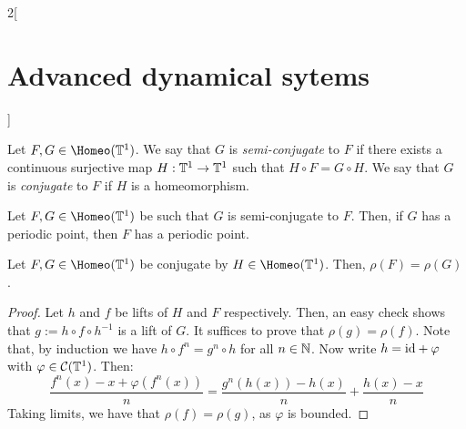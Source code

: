 \documentclass[../../../main_math.tex]{subfiles}
\begin{document}
\begin{multicols}{2}[\section{Advanced dynamical sytems}]
\begin{definition}
  \end{definition}
  \begin{definition}
    Let $F,G\in\Homeo(\TT^1)$. We say that $G$ is \emph{semi-conjugate} to $F$ if there exists a continuous surjective map $H:\mathbb{T}^1\to \mathbb{T}^1$ such that $H\circ F=G\circ H$. We say that $G$ is \emph{conjugate} to $F$ if $H$ is a homeomorphism.
  \end{definition}
  \begin{lemma}
    Let $F,G\in\Homeo(\TT^1)$ be such that $G$ is semi-conjugate to $F$. Then, if $G$ has a periodic point, then $F$ has a periodic point.
  \end{lemma}
  \begin{theorem}
    Let $F,G\in\Homeo(\TT^1)$ be conjugate by $H\in \Homeo(\TT^1)$. Then, $\rho(F)=\rho(G)$.
  \end{theorem}
  \begin{proof}
    Let $h$ and $f$ be lifts of $H$ and $F$ respectively. Then, an easy check shows that $g:=h\circ f\circ h^{-1}$ is a lift of $G$. It suffices to prove that $\rho(g)=\rho(f)$. Note that, by induction we have $h\circ f^n=g^n\circ h$ for all $n\in\mathbb{N}$. Now write $h=\mathrm{id} + \varphi$ with $\varphi\in \mathcal{C}(\mathbb{T}^1)$. Then:
    \begin{equation*}
      \frac{f^n(x)-x+\varphi(f^n(x))}{n}= \frac{g^n(h(x))-h(x)}{n}+\frac{h(x)-x}{n}
    \end{equation*}
    Taking limits, we have that $\rho(f)=\rho(g)$, as $\varphi$ is bounded.
  \end{proof}

\end{multicols}
\end{document}
